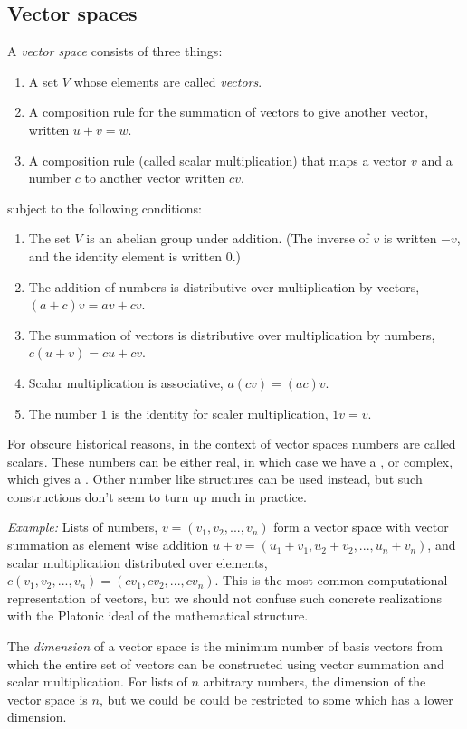 
\subsection{Vector spaces}
A {\sl vector space} consists of three things:
  \begin{enumerate}
 \item A set $V$ whose elements are called {\sl vectors}.
 \item A composition rule for the summation of vectors to give another vector, written $u+v=w$.
 \item A composition rule (called  scalar multiplication) that maps a vector $v$ and a number $c$ to another vector written $cv$.
 \end{enumerate}
subject to the following conditions:
  \begin{enumerate}
  \item The set $V$ is an abelian group under addition. (The inverse of $v$ is written $-v$, and the identity element is written $0$.)
  \item The addition of numbers is distributive over multiplication by vectors, $(a+c)v=av + cv$.
  \item The summation of vectors is distributive over multiplication by numbers, $c(u+v)=cu + cv$.
  \item Scalar multiplication is associative, $a (cv) = (ac) v$. 
 \item The number $1$ is the identity for scaler multiplication, $1v=v$.
 \end{enumerate}
 For obscure historical reasons, in the context of vector spaces numbers are called scalars.
These numbers can be either real, in which case we have a , or complex, which gives a . Other number like structures can be used instead, but such constructions don't seem to turn up much in practice. 

{\sl Example:} Lists of numbers, $v=(v_1, v_2, ..., v_n)$ form a vector space with vector summation as element wise addition $u+v = (u_1+v_1, u_2 +v_2, ..., u_n+ v_n)$, and scalar multiplication distributed over elements, $c(v_1, v_2, ..., v_n) =(cv_1, cv_2, ..., cv_n)$. This is the most common computational representation of vectors, but we should not confuse such concrete realizations with the Platonic ideal of the mathematical structure. 

The {\sl dimension} of a vector space is the minimum number of {basis vectors} from which the entire set of vectors can be constructed using vector summation and scalar multiplication. For lists of $n$ arbitrary numbers, the dimension of the vector space is $n$, but we could be could be restricted to some  which has a lower dimension. 



